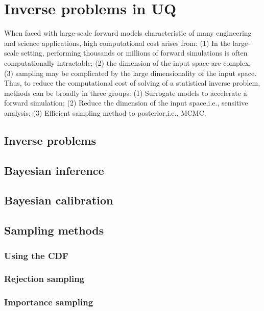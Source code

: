 \section{Inverse problems in UQ}

When faced with large-scale forward models characteristic of many engineering and science applications, high computational cost arises from: (1) In the large-scale setting, performing thousands or millions of forward simulations is often computationally intractable; (2)  the dimension of the input space are complex; (3) sampling may be complicated by the large dimensionality of the input space. Thus, to reduce the computational cost of solving of a statistical inverse problem, methods can be broadly in three groups: (1) Surrogate models to accelerate a forward simulation; (2) Reduce the dimension of the input space,i.e., sensitive analysis; (3) Efficient sampling method to posterior,i.e., MCMC.



\subsection{Inverse problems}

\subsection{Bayesian inference}

\subsection{Bayesian calibration}

\subsection{Sampling methods}

\subsubsection{Using the CDF}



\subsubsection{Rejection sampling}


\subsubsection{Importance sampling}

